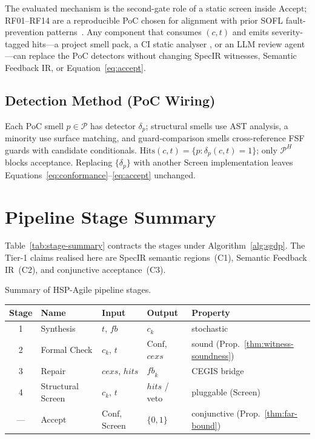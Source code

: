 The evaluated mechanism is the second-gate role of a static screen inside
$\mathrm{Accept}$; RF01--RF14 are a reproducible PoC chosen for
alignment with prior SOFL fault-prevention patterns~\citep{li2023iet_faultprevention}.
Any component that consumes $(c,t)$ and emits severity-tagged hits---a project
smell pack, a CI static analyser
\cite{hovemeyer2004findbugs,ayewah2007findbugs}, or an LLM review
agent---can replace the PoC detectors without changing SpecIR witnesses,
Semantic Feedback IR, or Equation~\eqref{eq:accept}.

\subsection{Detection Method (PoC Wiring)}
\label{subsec:method:detection}

Each PoC smell $p \in \mathcal{P}$ has detector $\delta_p$; structural smells
use AST analysis, a minority use surface matching, and guard-comparison
smells cross-reference FSF guards with candidate conditionals.
$\mathrm{Hits}(c,t) = \{p : \delta_p(c,t)=1\}$; only $\mathcal{P}^H$ blocks
acceptance.
Replacing $\{\delta_p\}$ with another $\mathrm{Screen}$ implementation leaves
Equations~\eqref{eq:conformance}--\eqref{eq:accept} unchanged.

\section{Pipeline Stage Summary}
\label{sec:method:summary}

Table~\ref{tab:stage-summary} contracts the stages under Algorithm~\ref{alg:sgdp}.
The Tier-1 claims realised here are SpecIR semantic regions~(C1), Semantic
Feedback IR~(C2), and conjunctive acceptance~(C3).

\begin{inlinetable}{Summary of HSP-Agile pipeline stages.}
  \label{tab:stage-summary}
  \footnotesize
  \setlength{\tabcolsep}{3pt}
  \begin{tabularx}{\linewidth}{@{}clXXl@{}}
    \toprule
    Stage & Name          & Input               & Output                     & Property \\
    \midrule
    1     & Synthesis     & $t$, $\mathit{fb}$  & $c_k$                      & stochastic \\
    2     & Formal Check  & $c_k$, $t$          & $\mathrm{Conf}$, $\mathit{cexs}$ & sound (Prop.~\ref{thm:witness-soundness}) \\
    3     & Repair        & $\mathit{cexs}$, $\mathit{hits}$ & $\mathit{fb}_k$ & CEGIS bridge \\
    4     & Structural Screen & $c_k$, $t$          & $\mathit{hits}$ / veto     & pluggable ($\mathrm{Screen}$) \\
    ---   & Accept        & $\mathrm{Conf}$, $\mathrm{Screen}$ & $\{0,1\}$     & conjunctive (Prop.~\ref{thm:far-bound}) \\
    \bottomrule
  \end{tabularx}
\end{inlinetable}
